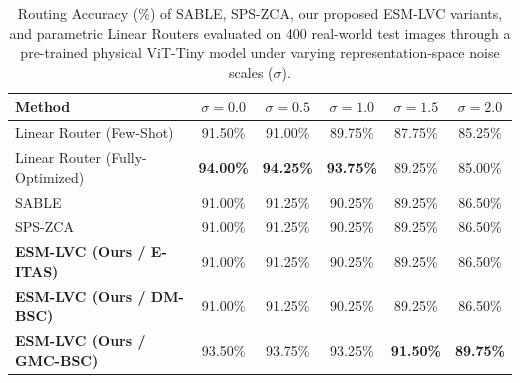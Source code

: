 \begin{table}[t]
\caption{Routing Accuracy (\%) of SABLE, SPS-ZCA, our proposed ESM-LVC variants, and parametric Linear Routers evaluated on 400 real-world test images through a pre-trained physical ViT-Tiny model under varying representation-space noise scales ($\sigma$).}
\label{tab:physical_routing}
\vskip 0.15in
\begin{center}
\begin{small}
\begin{sc}
\begin{tabular}{lccccc}
\toprule
Method & $\sigma = 0.0$ & $\sigma = 0.5$ & $\sigma = 1.0$ & $\sigma = 1.5$ & $\sigma = 2.0$ \\
\midrule
Linear Router (Few-Shot) & 91.50\% & 91.00\% & 89.75\% & 87.75\% & 85.25\% \\
Linear Router (Fully-Optimized) & \textbf{94.00\%} & \textbf{94.25\%} & \textbf{93.75\%} & 89.25\% & 85.00\% \\
SABLE & 91.00\% & 91.25\% & 90.25\% & 89.25\% & 86.50\% \\
SPS-ZCA & 91.00\% & 91.25\% & 90.25\% & 89.25\% & 86.50\% \\
\textbf{ESM-LVC (Ours / E-ITAS)} & 91.00\% & 91.25\% & 90.25\% & 89.25\% & 86.50\% \\
\textbf{ESM-LVC (Ours / DM-BSC)} & 91.00\% & 91.25\% & 90.25\% & 89.25\% & 86.50\% \\
\textbf{ESM-LVC (Ours / GMC-BSC)} & 93.50\% & 93.75\% & 93.25\% & \textbf{91.50\%} & \textbf{89.75\%} \\
\bottomrule
\end{tabular}
\end{sc}
\end{small}
\end{center}
\vskip -0.1in
\end{table}

